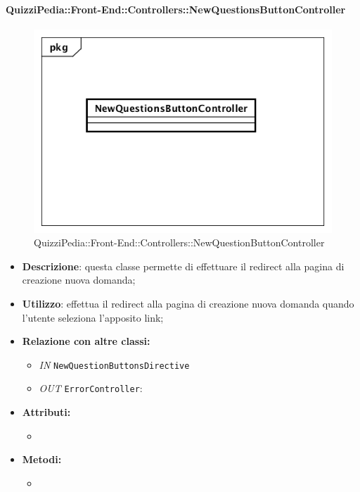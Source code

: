 \paragraph{QuizziPedia::Front-End::Controllers::NewQuestionsButtonController}
\begin{figure}
	\centering
	\includegraphics[scale=0.45]{UML/Classi/Front-End/QuizziPedia_Front-end_Controller_NewQuestionsButtonController.png}
	\caption{QuizziPedia::Front-End::Controllers::NewQuestionButtonController}
\end{figure}
\begin{itemize}
	\item \textbf{Descrizione}: questa classe permette di effettuare il redirect alla pagina di creazione nuova domanda;
	\item \textbf{Utilizzo}: effettua il redirect alla pagina di creazione nuova domanda quando l'utente seleziona l'apposito link;
	\item \textbf{Relazione con altre classi:}
	\begin{itemize}
		\item \textit{IN} \texttt{NewQuestionButtonsDirective} 
		\item \textit{OUT} \texttt{ErrorController}: 
	\end{itemize}
	\item \textbf{Attributi:}
	\begin{itemize}
		\item 
	\end{itemize}
	\item \textbf{Metodi:}
	\begin{itemize}
		\item 
	\end{itemize}
\end{itemize}

